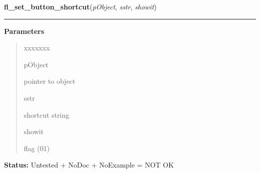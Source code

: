 \hspace{.8\funcindent}\begin{boxedminipage}{\funcwidth}

    \raggedright \textbf{fl\_set\_button\_shortcut}(\textit{pObject}, \textit{sstr}, \textit{showit})

    \vspace{-1.5ex}

    \rule{\textwidth}{0.5\fboxrule}
\setlength{\parskip}{2ex}
\setlength{\parskip}{1ex}
      \textbf{Parameters}
      \vspace{-1ex}

      \begin{quote}
        \begin{Ventry}{xxxxxxx}

          \item[pObject]

          pointer to object

          \item[sstr]

          shortcut string

          \item[showit]

          flag (0{\textbar}1)

        \end{Ventry}

      \end{quote}

\textbf{Status:} Untested + NoDoc + NoExample = NOT OK



    \end{boxedminipage}

    \label{xformslib:library:fl_create_generic_button}

    \vspace{0.5ex}

